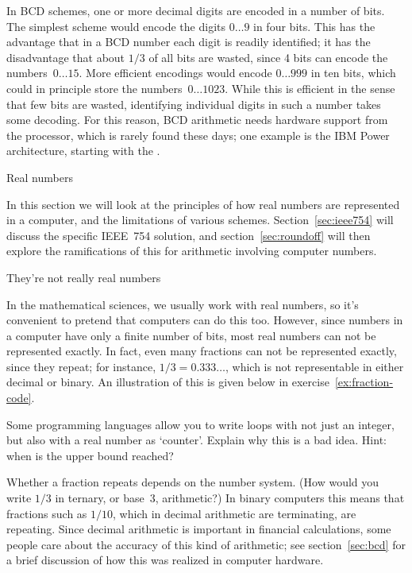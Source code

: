 In BCD schemes, one or more decimal digits are encoded in a number of
bits. The simplest scheme would encode the digits $0\ldots9$ in four
bits. This has the advantage that in a
BCD number each digit is readily identified; it has the disadvantage
that about $1/3$ of all bits are wasted, since 4 bits can
encode the numbers~$0\ldots15$.
%
More efficient encodings would encode $0\ldots999$ in ten bits, which
could in principle store the numbers~$0\ldots1023$. While this is
efficient in the sense that few bits are wasted, identifying
individual digits in such a number takes some decoding. For this
reason, BCD arithmetic needs hardware support from the processor,
which is rarely found these days; one example is the IBM
Power architecture, starting with the .

 {Real numbers}
\label{sec:real-numbers}

In this section we will look at the principles of how real numbers are
represented in a computer, and the limitations of various schemes.
Section~\ref{sec:ieee754} will discuss the specific IEEE~754
solution, and
section~\ref{sec:roundoff} will then explore the ramifications of this for arithmetic
involving computer numbers.

 {They're not really real numbers}
\label{sec:arith-intro}

In the mathematical sciences, we usually work with real numbers, so
it's convenient to pretend that computers can do this too. However,
since numbers in a computer have only a finite number of bits, most
real numbers can not be represented exactly. In fact, even many
fractions can not be represented exactly, since they repeat; for
instance, $1/3=0.333\ldots$, which is not representable in either
decimal or binary. An illustration of this is given below
in exercise~\ref{ex:fraction-code}.

\begin{exercise}
  Some programming languages allow you to write loops with not just an
  integer, but also with a real number as `counter'. Explain why this
  is a bad idea. Hint: when is the upper bound reached?
\end{exercise}

Whether a fraction repeats depends on the number system. (How would
you write $1/3$ in ternary, or base~3, arithmetic?) In binary computers
this means that fractions such as $1/10$, which in decimal arithmetic
are terminating, are repeating. Since decimal arithmetic is important
in financial calculations, some
people care about the accuracy of this kind of arithmetic;
see section~\ref{sec:bcd} for a brief discussion
of how this was realized in computer hardware.

